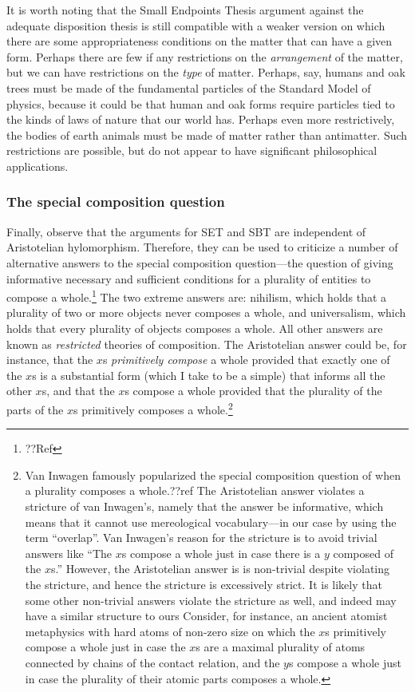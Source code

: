 It is worth noting that the Small Endpoints Thesis argument against the adequate disposition thesis is still compatible with 
a weaker version on which there are some appropriateness conditions on the matter that can have a given form. Perhaps there 
are few if any restrictions on the \textit{arrangement} of the matter, but we can have restrictions on the \textit{type} of 
matter. Perhaps, say, humans and oak trees must be made of the fundamental particles of the Standard Model of physics,
because it could be that human and oak forms require particles tied to the kinds of laws of nature that our world has.
Perhaps even more restrictively, the bodies of earth animals must be made of matter rather than antimatter. Such restrictions
are possible, but do not appear to have significant philosophical applications.

\subsubsection{The special composition question}
Finally, observe that the arguments for SET and SBT are independent of Aristotelian hylomorphism. Therefore, they can be used
to criticize a number of alternative answers to the special composition question---the question of giving informative 
necessary and sufficient conditions for a plurality of entities to compose a whole.\footnote{??Ref}  The two extreme answers are: nihilism, which holds that a plurality of two or more objects never 
composes a whole, and universalism, which holds that every plurality of objects composes a whole. All other answers are known 
as \textit{restricted} theories of composition. The Aristotelian answer could be, for instance, that the $x$s \textit{primitively compose} a whole provided that exactly one of the $x$s is a substantial form (which I take to be a simple) that informs all the 
other $x$s, and that the $x$s compose a whole provided that the plurality of the parts of the $x$s primitively composes a 
whole.\footnote{Van Inwagen famously popularized the special composition question of when a plurality
composes a whole.??ref The Aristotelian answer violates a stricture of van Inwagen's, namely that the answer be informative,
which means that it cannot use mereological vocabulary---in our case by using the term ``overlap''. Van Inwagen's reason for 
the stricture is to avoid trivial answers like ``The $x$s compose a whole just in case there is a $y$ composed of the $x$s.'' 
However, the Aristotelian answer is is non-trivial despite violating the stricture, and hence the stricture is 
excessively strict. It is likely that some other non-trivial answers violate the stricture as well, and indeed may have a similar structure to ours Consider, for instance, an ancient atomist metaphysics with hard atoms of non-zero size 
on which the $x$s primitively compose a whole just in case the $x$s are a maximal plurality of atoms connected by chains of 
the contact relation, and the $y$s compose a whole just in case the plurality of their atomic parts composes a whole.}

